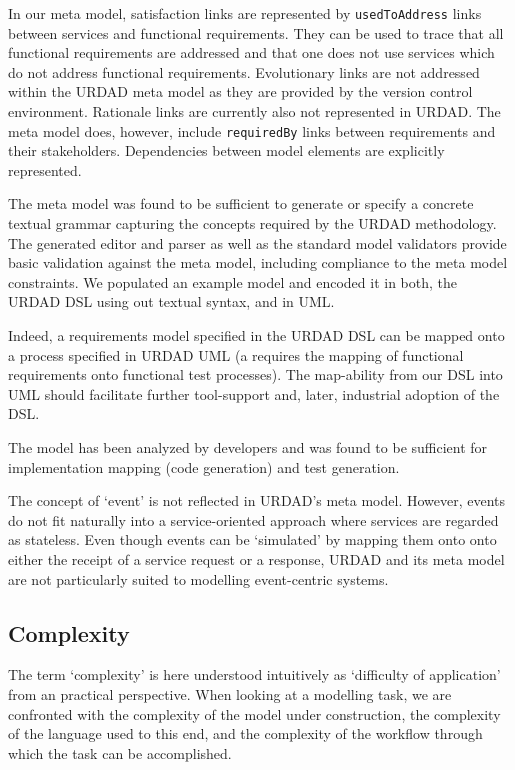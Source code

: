 In our meta model, satisfaction links are represented by \verb+usedToAddress+ links between services and functional requirements. They can be used to trace that all functional requirements are addressed and that one does not use services which do not address functional requirements. Evolutionary links are not addressed within the URDAD meta model as they are provided by the version control environment. Rationale links are currently also not represented in URDAD. The meta model does, however, include  \verb+requiredBy+ links between requirements and their stakeholders. Dependencies between model elements are explicitly represented. 

The meta model was found to be sufficient to generate or specify a concrete textual grammar capturing the concepts required by the URDAD methodology. The generated editor and parser as well as the standard model validators provide basic validation against the meta model, including compliance to the meta model constraints. We populated an example model and encoded it in both, the URDAD DSL using out textual syntax, and in UML.

Indeed, a requirements model specified in the URDAD DSL can be mapped onto a process specified in URDAD UML (a requires the mapping of functional requirements onto functional test processes). The map-ability from our DSL into UML should facilitate further tool-support and, later, industrial adoption of the DSL.

The model has been analyzed by developers and was found to be sufficient for implementation mapping (code generation) and test generation.

The concept of `event' is not reflected in URDAD's meta model. However, events do not fit naturally into a service-oriented approach where services are regarded as stateless. Even though events can be `simulated' by mapping them onto onto either the receipt of a service request or a response, URDAD and its meta model are not particularly suited to modelling event-centric systems.

\subsection{Complexity}
The term `complexity' is here understood intuitively as `difficulty of application' from an practical perspective. When looking at a modelling task, we are confronted with the complexity of the model under construction, the complexity of the language used to this end, and the complexity of the workflow through which the task can be accomplished.

